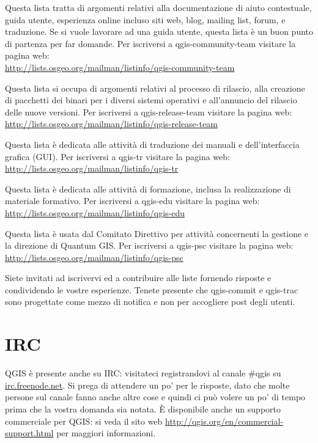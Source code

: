 Questa lista tratta di argomenti relativi alla documentazione di
aiuto contestuale, guida utente, esperienza online incluso siti web, 
blog, mailing list, forum, e traduzione. Se si vuole lavorare ad una guida utente, questa lista è un buon punto di partenza 
per far domande.
Per iscriversi a qgis-community-team visitare la pagina web: \\
\url{http://lists.osgeo.org/mailman/listinfo/qgis-community-team}

Questa lista si occupa di argomenti relativi al processo di rilascio, 
alla creazione di pacchetti dei binari per i diversi sistemi operativi 
e all'annuncio del rilascio delle nuove versioni.
Per iscriversi a qgis-release-team visitare la pagina web: \\
\url{http://lists.osgeo.org/mailman/listinfo/qgis-release-team}

Questa lista è dedicata alle attività di traduzione dei manuali e dell'interfaccia grafica (GUI).
Per iscriversi a qgis-tr visitare la pagina web: \\
\url{http://lists.osgeo.org/mailman/listinfo/qgis-tr}

Questa lista è dedicata alle attività di formazione, inclusa la realizzazione 
di materiale formativo.
Per iscriversi a qgis-edu visitare la pagina web: \\
\url{http://lists.osgeo.org/mailman/listinfo/qgis-edu}

Questa lista è usata dal Comitato Direttivo per attività concernenti 
la gestione e la direzione di Quantum GIS. 
Per iscriversi a qgis-psc visitare la pagina web: \\
\url{http://lists.osgeo.org/mailman/listinfo/qgis-psc}

Siete invitati ad iscrivervi ed a contribuire 
alle liste fornendo risposte e condividendo le vostre esperienze. Tenete 
presente che qgis-commit e qgis-trac sono progettate come mezzo di notifica 
e non per accogliere post degli utenti. 

\section{IRC}
QGIS è presente anche su IRC: visitateci registrandovi al canale \#qgis su
\url{irc.freenode.net}. Si prega di attendere un po' per le risposte, dato 
che molte persone sul canale fanno anche altre cose e quindi ci può volere 
un po' di tempo prima che la vostra domanda sia notata.
È disponibile anche un supporto commerciale per QGIS: si veda il sito web 
\url{http://qgis.org/en/commercial-support.html} per maggiori informazioni.


